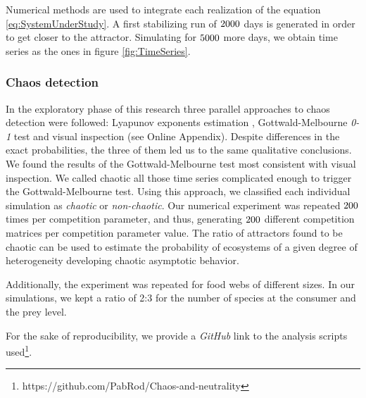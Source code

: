 Numerical methods are used to integrate each realization of the equation \ref{eq:SystemUnderStudy}. A first stabilizing run of $ 2000 $ days is generated in order to get closer to the attractor. Simulating for $ 5000 $ more days, we obtain time series as the ones in figure \ref{fig:TimeSeries}.

\subsubsection{Chaos detection}
\label{subsubsec:ChaosDetection}
In the exploratory phase of this research three parallel approaches to chaos detection were followed: Lyapunov exponents estimation \cite{Strogatz1994}, Gottwald-Melbourne \textit{0-1} test \cite{Gottwald2009} and visual inspection (see Online Appendix). Despite differences in the exact probabilities, the three of them led us to the same qualitative conclusions. We found the results of the Gottwald-Melbourne test most consistent with visual inspection. We called chaotic all those time series complicated enough to trigger the Gottwald-Melbourne test. Using this approach, we classified each individual simulation as \textit{chaotic} or \textit{non-chaotic}. Our numerical experiment was repeated $ 200 $ times per competition parameter, and thus, generating $ 200 $ different competition matrices per competition parameter value. The ratio of attractors found to be chaotic can be used to estimate the probability of ecosystems of a given degree of heterogeneity developing chaotic asymptotic behavior.

Additionally, the experiment was repeated for food webs of different sizes. In our simulations, we kept a ratio of 2:3 for the number of species at the consumer and the prey level.

For the sake of reproducibility, we provide a \textit{GitHub} link to the analysis scripts used\footnote{https://github.com/PabRod/Chaos-and-neutrality}.